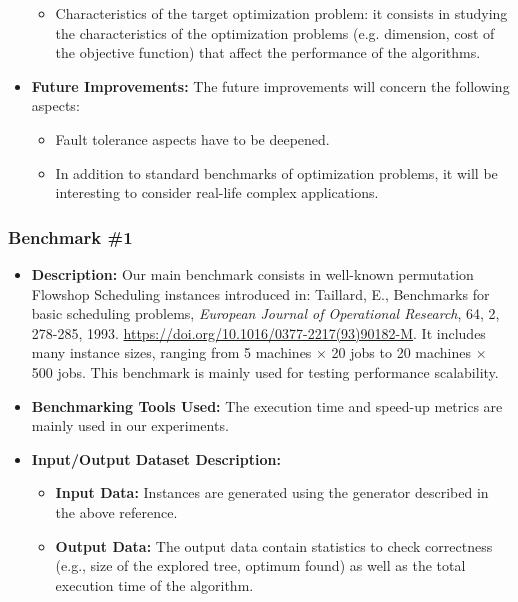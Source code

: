 \begin{itemize}
\begin{itemize}
        \item Characteristics of the target optimization problem: it consists in studying the characteristics of the optimization problems (e.g. dimension, cost of the objective function) that affect the performance of the algorithms.
    \end{itemize}
    \item \textbf{Future Improvements:} 
    The future improvements will concern the following aspects:
    \begin{itemize}
        \item Fault tolerance aspects have to be deepened.
        \item In addition to standard benchmarks of optimization problems, it will be interesting to consider real-life complex applications.
    \end{itemize}
\end{itemize}

\subsubsection{Benchmark \#1}
\begin{itemize}
    \item \textbf{Description:} Our main benchmark consists in well-known permutation Flowshop Scheduling instances introduced in: Taillard, E., Benchmarks for basic scheduling problems, \textit{European Journal of Operational Research}, 64, 2, 278-285, 1993. \url{https://doi.org/10.1016/0377-2217(93)90182-M}. It includes many instance sizes, ranging from 5 machines $\times$ 20 jobs to 20 machines $\times$ 500 jobs. This benchmark is mainly used for testing performance scalability.
    \item \textbf{Benchmarking Tools Used:} The execution time and speed-up metrics are mainly used in our experiments.
    \item \textbf{Input/Output Dataset Description:}
        \begin{itemize}
            \item \textbf{Input Data:} Instances are generated using the generator described in the above reference.
            \item \textbf{Output Data:} The output data contain statistics to check correctness (e.g., size of the explored tree, optimum found) as well as the total execution time of the algorithm.
        \end{itemize}
\end{itemize}

